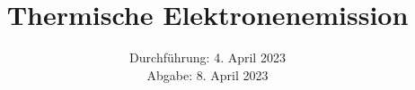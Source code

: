 

\subject{\texorpdfstring{\vspace{2ex}}{}V504\texorpdfstring{\vspace{-2ex}}{}} %
\title{Thermische Elektronenemission} %
\date{
	Durchführung: 4. April 2023 %
	\\ Abgabe: 8. April 2023 %
}




\maketitle
\thispagestyle{empty}


\tableofcontents
\newpage







\printbibliography{}

\newpage



